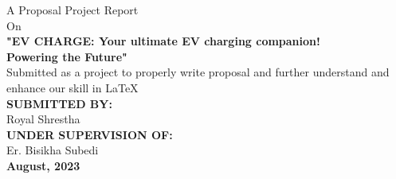 {
    \thispagestyle{empty}
    \centering

   \fontsize{14pt}{14pt}\selectfont
        {A Proposal Project Report}\\ 
        {On}\\[1.5cm]

        
            \textbf{"\MakeUppercase{ev charge}: Your ultimate EV charging companion! \\ Powering the Future"}\\[2cm]
    {Submitted as a project to properly write proposal and further understand and enhance our skill in \LaTeX}\\[3cm]
    \textbf{\MakeUppercase{Submitted By:}}\\
    {Royal Shrestha}\\[2.5cm]
    
    \textbf{\MakeUppercase{Under Supervision Of:}}\\
    {Er. Bisikha Subedi}\\[2.5cm]
    \vspace{1.5in}
        \textbf{August, 2023}\\
}
